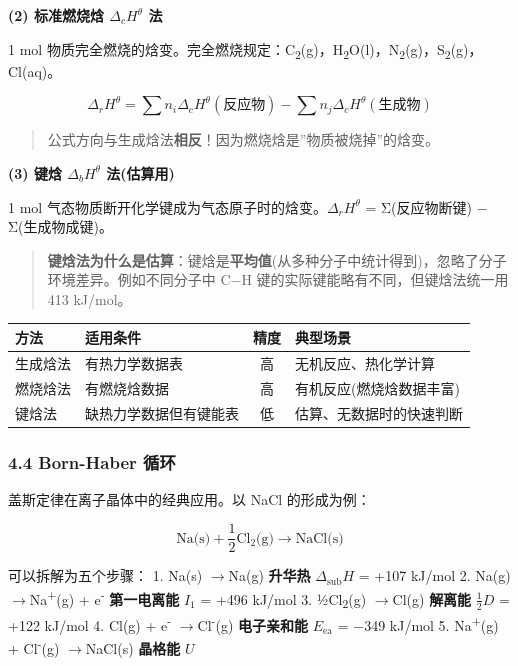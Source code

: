 \documentclass[a4paper,11pt]{ctexart}
\newcounter{none}
\newcommand{\箭}{\ensuremath{\rightarrow}}
\newcommand{\左箭}{\ensuremath{\leftarrow}}
\newcommand{\上箭}{\ensuremath{\uparrow}}
\newcommand{\下箭}{\ensuremath{\downarrow}}
\newcommand{\衡}{\ensuremath{\rightleftharpoons}}
\newcommand{\双箭}{\ensuremath{\leftrightarrow}}
\newcommand{\约等于}{\ensuremath{\approx}}
\newcommand{\小于等于}{\ensuremath{\leq}}
\newcommand{\大于等于}{\ensuremath{\geq}}
\newcommand{\不等于}{\ensuremath{\neq}}
\newcommand{\西格马}{\ensuremath{\sigma}}
\newcommand{\派}{\ensuremath{\pi}}
\begin{document}
\textbf{(2) 标准燃烧焓 \(\Delta_c H^\theta\) 法}

1 mol 物质完全燃烧的焓变。完全燃烧规定：C\textsubscript{2}(g)，H\textsubscript{2}O(l)，N\textsubscript{2}(g)，S\textsubscript{2}(g)，Cl(aq)。

\[
\Delta_r H^\theta = \sum n_i \Delta_c H^\theta(\text{反应物}) - \sum n_j \Delta_c H^\theta(\text{生成物})
\]

\begin{quote}
公式方向与生成焓法\textbf{相反}！因为燃烧焓是''物质被烧掉''的焓变。
\end{quote}

\textbf{(3) 键焓 \(\Delta_b H^\theta\) 法(估算用)}

1 mol 气态物质断开化学键成为气态原子时的焓变。\(\Delta_r H^\theta\) = Σ(反应物断键) − Σ(生成物成键)。

\begin{quote}
\textbf{键焓法为什么是估算}：键焓是\textbf{平均值}(从多种分子中统计得到)，忽略了分子环境差异。例如不同分子中 C−H 键的实际键能略有不同，但键焓法统一用 413 kJ/mol。
\end{quote}

{\def\LTcaptype{none} %
\begin{longtable}[]{@{}llcl@{}}
\toprule\noalign{}
方法 & 适用条件 & 精度 & 典型场景 \\
\midrule\noalign{}
\endhead
\bottomrule\noalign{}
\endlastfoot
生成焓法 & 有热力学数据表 & 高 & 无机反应、热化学计算 \\
燃烧焓法 & 有燃烧焓数据 & 高 & 有机反应(燃烧焓数据丰富) \\
键焓法 & 缺热力学数据但有键能表 & 低 & 估算、无数据时的快速判断 \\
\end{longtable}
}

\subsubsection{4.4 Born-Haber 循环}\label{born-haber-ux5faaux73af}

盖斯定律在离子晶体中的经典应用。以 NaCl 的形成为例：

\[\text{Na(s)} + \frac{1}{2}\text{Cl}_2\text{(g)} \to \text{NaCl(s)}\]

可以拆解为五个步骤：
1. Na(s) \箭 Na(g) \textbf{升华热} \(\Delta_{\text{sub}}H\) = +107 kJ/mol
2. Na(g) \箭 Na\textsuperscript{+}(g) + e\textsuperscript{-} \textbf{第一电离能} \(I_1\) = +496 kJ/mol
3. ½Cl\textsubscript{2}(g) \箭 Cl(g) \textbf{解离能} \(\frac{1}{2}D\) = +122 kJ/mol
4. Cl(g) + e\textsuperscript{-} \箭 Cl\textsuperscript{-}(g) \textbf{电子亲和能} \(E_{\text{ea}}\) = −349 kJ/mol
5. Na\textsuperscript{+}(g) + Cl\textsuperscript{-}(g) \箭 NaCl(s) \textbf{晶格能} \(U\)
\end{document}
